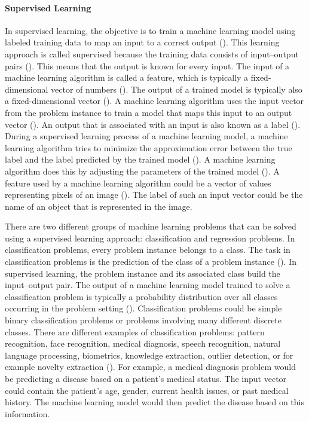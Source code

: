 \documentclass{BachelorBUI}
\begin{document}
            \paragraph{Supervised Learning}

                In supervised learning, the objective is to train a machine learning model using labeled training data to map an input to a correct output (\cite{Alpaydin:2014}). This learning approach is called supervised because the training data consists of input--output pairs (\cite{Murphy:2022}). This means that the output is known for every input. The input of a machine learning algorithm is called a feature, which is typically a fixed-dimensional vector of numbers (\cite{Murphy:2022}). The output of a trained model is typically also a fixed-dimensional vector (\cite{Bishop:2006}). A machine learning algorithm uses the input vector from the problem instance to train a model that maps this input to an output vector (\cite{Bishop:2006}). An output that is associated with an input is also known as a label (\cite{Murphy:2022}). During a supervised learning process of a machine learning model, a machine learning algorithm tries to minimize the approximation error between the true label and the label predicted by the trained model (\cite{Alpaydin:2014}). A machine learning algorithm does this by adjusting the parameters of the trained model (\cite{Alpaydin:2014}). A feature used by a machine learning algorithm could be a vector of values representing pixels of an image (\cite{Murphy:2022}). The label of such an input vector could be the name of an object that is represented in the image.

                There are two different groups of machine learning problems that can be solved using a supervised learning approach: classification and regression problems. In classification problems, every problem instance belongs to a class. The task in classification problems is the prediction of the class of a problem instance (\cite{Goodfellow:2016}). In supervised learning, the problem instance and its associated class build the input--output pair. The output of a machine learning model trained to solve a classification problem is typically a probability distribution over all classes occurring in the problem setting (\cite{Goodfellow:2016}). Classification problems could be simple binary classification problems or problems involving many different discrete classes. There are different examples of classification problems: pattern recognition, face recognition, medical diagnosis, speech recognition, natural language processing, biometrics, knowledge extraction, outlier detection, or for example novelty extraction (\cite{Alpaydin:2014}). For example, a medical diagnosis problem would be predicting a disease based on a patient's medical status. The input vector could contain the patient's age, gender, current health issues, or past medical history. The machine learning model would then predict the disease based on this information.
\end{document}
